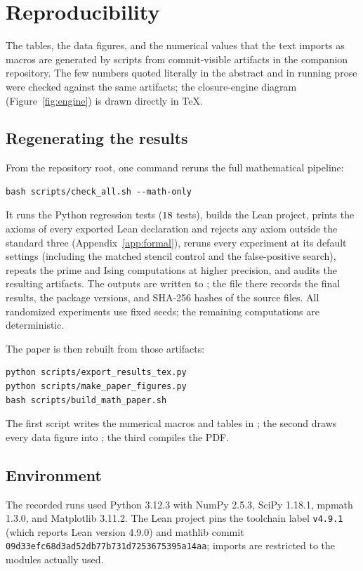 \section{Reproducibility}
\label{sec:reproducibility}

The tables, the data figures, and the numerical values that the text imports as macros are generated by scripts from commit-visible artifacts in the companion repository.
The few numbers quoted literally in the abstract and in running prose were checked against the same artifacts; the closure-engine diagram (Figure~\ref{fig:engine}) is drawn directly in \TeX.

\subsection{Regenerating the results}
From the repository root, one command reruns the full mathematical pipeline:
\begin{verbatim}
bash scripts/check_all.sh --math-only
\end{verbatim}
It runs the Python regression tests ($18$ tests), builds the Lean project, prints the axioms of every exported Lean declaration and rejects any axiom outside the standard three (Appendix~\ref{app:formal}), reruns every experiment at its default settings (including the matched stencil control and the false-positive search), repeats the prime and Ising computations at higher precision, and audits the resulting artifacts.
The outputs are written to ; the file  there records the final results, the package versions, and SHA-256 hashes of the source files.
All randomized experiments use fixed seeds; the remaining computations are deterministic.

The paper is then rebuilt from those artifacts:
\begin{verbatim}
python scripts/export_results_tex.py
python scripts/make_paper_figures.py
bash scripts/build_math_paper.sh
\end{verbatim}
The first script writes the numerical macros and tables in ; the second draws every data figure into ; the third compiles the PDF.

\subsection{Environment}
The recorded runs used Python 3.12.3 with NumPy 2.5.3, SciPy 1.18.1, mpmath 1.3.0, and Matplotlib 3.11.2.
The Lean project pins the toolchain label \texttt{v4.9.1} (which reports Lean version 4.9.0) and mathlib commit \texttt{09d33efc68d3ad52db77b731d7253675395a14aa}; imports are restricted to the modules actually used.

